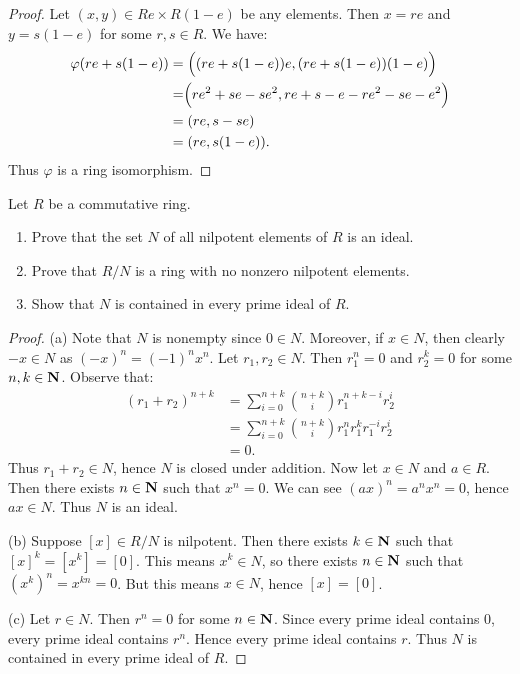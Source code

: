 \documentclass[11pt,twoside,openany]{memoir}
\begin{document}
{\begin{proof}
        Let $(x,y) \in Re \times R(1-e)$ be any elements. Then $x = re$ and $y = s(1-e)$ for some $r,s \in R$. We have:
            \begin{equation*}
            \begin{split}
                \varphi(re + s(1-e))
                & = \Bigl((re+s(1-e))e, (re+s(1-e))(1-e)\Bigr) \\
                & = \Bigr( re^2 +se - se^2, re +s -e - re^2 -se -e^2\Bigl) \\
                & = (re, s -se) \\
                & = (re,s(1-e)).
            \end{split}
            \end{equation*}
        Thus $\varphi$ is a ring isomorphism.
    \end{proof}}
\begin{problem}[S16, P3]
Let $R$ be a commutative ring.
\begin{enumerate}[label = (\alph*),itemsep=1pt,topsep=3pt]
    \item Prove that the set $N$ of all nilpotent elements of $R$ is an ideal.
    \item Prove that $R/N$ is a ring with no nonzero nilpotent elements.
    \item Show that $N$ is contained in every prime ideal of $R$.
\end{enumerate}
\end{problem}
    {\color{blue} \begin{proof}
        (a) Note that $N$ is nonempty since $0 \in N$. Moreover, if $x \in N$, then clearly $-x \in N$ as $(-x)^n = (-1)^n x^n$. Let $r_1,r_2 \in N$. Then $r_1^n = 0$ and $r_2^k = 0$ for some $n,k \in \mathbf{N}$. Observe that:
            \begin{equation*}
            \begin{split}
                (r_1 + r_2)^{n+k} 
                & = \sum_{i = 0}^{n+k} {n+k\choose i}r_1^{n+k-i}r_2^i \\
                & =\sum_{i = 0}^{n+k} {n+k\choose i}r_1^nr_1^kr_1^{-i}r_2^i \\
                & = 0.
            \end{split}
            \end{equation*}
        Thus $r_1+r_2 \in N$, hence $N$ is closed under addition. Now let $x \in N$ and $a \in R$. Then there exists $n \in \mathbf{N}$ such that $x^n = 0$. We can see $(ax)^n = a^n x^n = 0$, hence $ax \in N$. Thus $N$ is an ideal.

        (b) Suppose $[x] \in R/N$ is nilpotent. Then there exists $k \in \mathbf{N}$ such that $[x]^k = [x^k] = [0]$. This means $x^k \in N$, so there exists $n \in \mathbf{N}$ such that $(x^k)^n = x^{kn} = 0$. But this means $x \in N$, hence $[x]=[0]$.

        (c) Let $r \in N$. Then $r^n = 0$ for some $n \in \mathbf{N}$. Since every prime ideal contains 0, every prime ideal contains $r^n$. Hence every prime ideal contains $r$. Thus $N$ is contained in every prime ideal of $R$.
    \end{proof}}
\end{document}
